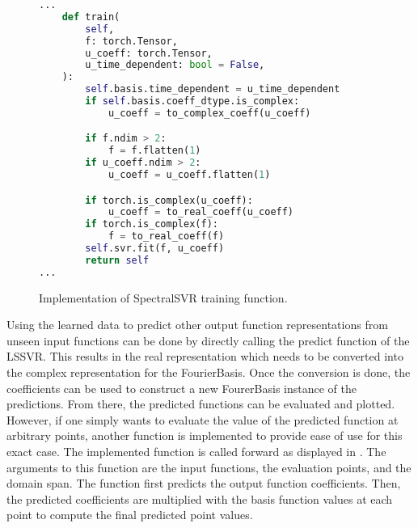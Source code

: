 \begin{figure}[H]
  \centering
  \begin{lstlisting}[language=Python]
...
    def train(
        self,
        f: torch.Tensor,
        u_coeff: torch.Tensor,
        u_time_dependent: bool = False,
    ):
        self.basis.time_dependent = u_time_dependent
        if self.basis.coeff_dtype.is_complex:
            u_coeff = to_complex_coeff(u_coeff)

        if f.ndim > 2:
            f = f.flatten(1)
        if u_coeff.ndim > 2:
            u_coeff = u_coeff.flatten(1)

        if torch.is_complex(u_coeff):
            u_coeff = to_real_coeff(u_coeff)
        if torch.is_complex(f):
            f = to_real_coeff(f)
        self.svr.fit(f, u_coeff)
        return self
...
  \end{lstlisting}
  \caption{Implementation of SpectralSVR training function.}\label{fig:spectralsvr_train_impl}
\end{figure}

Using the learned data to predict other output function representations from unseen input functions can be done by directly calling the predict function of the LSSVR\@. This results in the real representation which needs to be converted into the complex representation for the FourierBasis. Once the conversion is done, the coefficients can be used to construct a new FourerBasis instance of the predictions. From there, the predicted functions can be evaluated and  plotted. However, if one simply wants to evaluate the value of the predicted function at arbitrary points, another function is implemented to provide ease of use for this exact case. The implemented function is called forward as displayed in . The arguments to this function are the input functions, the evaluation points, and the domain span. The function first predicts the output function coefficients. Then, the predicted coefficients are multiplied with the basis function values at each point to compute the final predicted point values.

